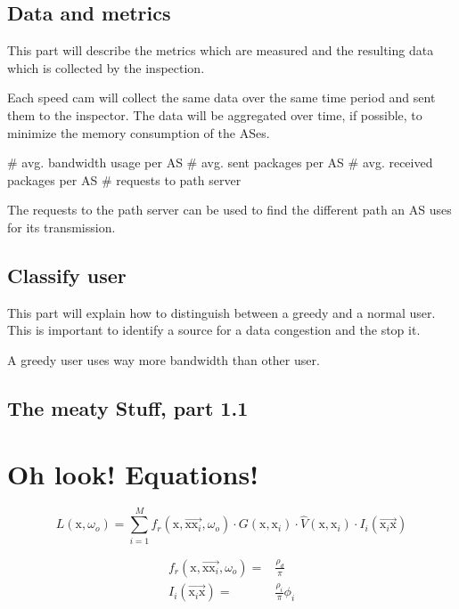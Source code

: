 \documentclass[thesis.tex]{subfiles}
\begin{document}
\subsection{Data and metrics}
This part will describe the metrics which are measured and the resulting data which is collected by the inspection.

Each speed cam will collect the same data over the same time period and sent them to the inspector. The data will be aggregated over time, if possible, to minimize the memory consumption of the ASes.

\begin{easylist}
    \MyListProperties
    # avg. bandwidth usage per AS
    # avg. sent packages per AS
    # avg. received packages per AS
    # requests to path server 
\end{easylist}

The requests to the path server can be used to find the different path an AS uses for its transmission.


\subsection{Classify user}
This part will explain how to distinguish between a greedy and a normal user. This is important to identify a source for a data congestion and the stop it.

A greedy user uses way more bandwidth than other user. 

\subsection{The meaty Stuff, part 1.1}

\section{Oh look! Equations!}

\begin{equation}
L(\mathrm{x}, \omega_o) = \sum\limits_{i=1}^{M} f_r(\mathrm{x}, \overrightarrow{\mathrm{x}\mathrm{x}_i}, \omega_o) \cdot G(\mathrm{x}, \mathrm{x}_i) \cdot \hat{V}(\mathrm{x}, \mathrm{x}_i) \cdot I_i(\overrightarrow{\mathrm{x}_i\mathrm{x}})
\end{equation}

\begin{align}
f_r(\mathrm{x}, \overrightarrow{\mathrm{x}\mathrm{x}_i}, \omega_o) =& \frac{\rho_d}{\pi}\\
I_i(\overrightarrow{\mathrm{x}_i\mathrm{x}}) =& \frac{\rho_i}{\pi} \phi_i
\end{align}
\end{document}
